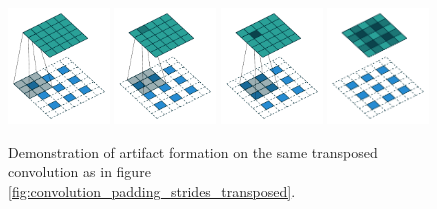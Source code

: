\begin{figure}[ht]
    \centering
    \includegraphics[width=0.24\textwidth]{images/transposed_artefacts_1.pdf}
    \includegraphics[width=0.24\textwidth]{images/transposed_artefacts_2.pdf}
    \includegraphics[width=0.24\textwidth]{images/transposed_artefacts_4.pdf}
    \includegraphics[width=0.24\textwidth]{images/transposed_artefacts_finished.pdf}
    \caption[Demonstration of artifact formation in transposed convolution ]{\label{fig:transposed_convolution_artefacts}
    Demonstration of artifact formation on the same transposed convolution as in figure \ref{fig:convolution_padding_strides_transposed}. \cite{convolutionguide}}
\end{figure}

